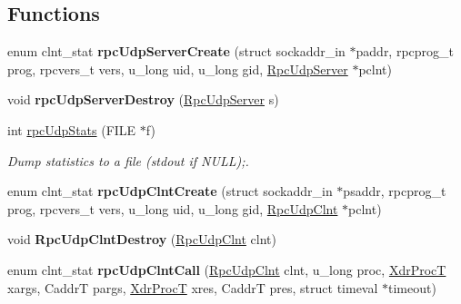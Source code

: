 \subsection*{Functions}
\begin{DoxyCompactItemize}
\item 
\mbox{\label{group__rtems-nfsclient_ga01ae0f3c23d1ae9eec7f461a6bef0d05}} 
enum clnt\+\_\+stat {\bfseries rpc\+Udp\+Server\+Create} (struct sockaddr\+\_\+in $\ast$paddr, rpcprog\+\_\+t prog, rpcvers\+\_\+t vers, u\+\_\+long uid, u\+\_\+long gid, \mbox{\hyperlink{structRpcUdpServerRec__}{Rpc\+Udp\+Server}} $\ast$pclnt)
\item 
\mbox{\label{group__rtems-nfsclient_gaefd644081168135cdfe1ee1aa375d41b}} 
void {\bfseries rpc\+Udp\+Server\+Destroy} (\mbox{\hyperlink{structRpcUdpServerRec__}{Rpc\+Udp\+Server}} s)
\item 
int \mbox{\hyperlink{group__rtems-nfsclient_ga25eec2b7dd88494b276528b6d765ba40}{rpc\+Udp\+Stats}} (F\+I\+LE $\ast$f)
\begin{DoxyCompactList}\small\item\em Dump statistics to a file (stdout if N\+U\+LL);. \end{DoxyCompactList}\item 
\mbox{\label{group__rtems-nfsclient_ga580b75ce413eaf48c457c2eaa050cbc3}} 
enum clnt\+\_\+stat {\bfseries rpc\+Udp\+Clnt\+Create} (struct sockaddr\+\_\+in $\ast$psaddr, rpcprog\+\_\+t prog, rpcvers\+\_\+t vers, u\+\_\+long uid, u\+\_\+long gid, \mbox{\hyperlink{structRpcUdpXactRec__}{Rpc\+Udp\+Clnt}} $\ast$pclnt)
\item 
\mbox{\label{group__rtems-nfsclient_ga97f7d288eeb05dd60a359d3ae4141c0a}} 
void {\bfseries Rpc\+Udp\+Clnt\+Destroy} (\mbox{\hyperlink{structRpcUdpXactRec__}{Rpc\+Udp\+Clnt}} clnt)
\item 
\mbox{\label{group__rtems-nfsclient_gac6a67c1cc59d4ca22853736249a4946a}} 
enum clnt\+\_\+stat {\bfseries rpc\+Udp\+Clnt\+Call} (\mbox{\hyperlink{structRpcUdpXactRec__}{Rpc\+Udp\+Clnt}} clnt, u\+\_\+long proc, \mbox{\hyperlink{group__rtems-nfsclient_gac22c99bf609cf4f3e1b601de1c157275}{Xdr\+ProcT}} xargs, CaddrT pargs, \mbox{\hyperlink{group__rtems-nfsclient_gac22c99bf609cf4f3e1b601de1c157275}{Xdr\+ProcT}} xres, CaddrT pres, struct timeval $\ast$timeout)

\end{DoxyCompactItemize}
